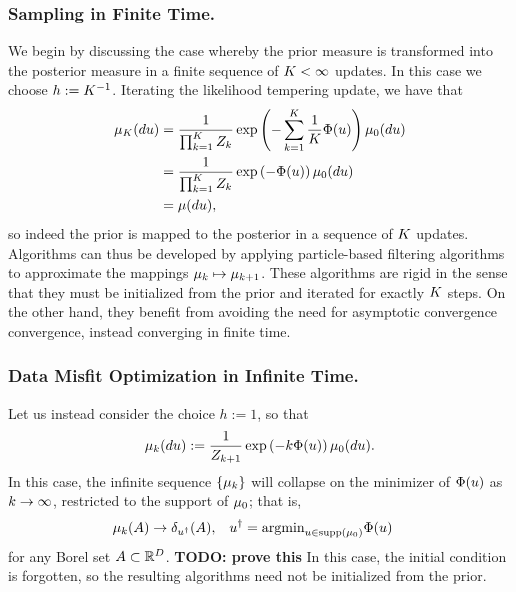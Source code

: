 \documentclass[12pt]{article}
\begin{document}
\subsubsection{Sampling in Finite Time.} 
We begin by discussing the case whereby the prior measure is transformed into the posterior measure 
in a finite sequence of $K < \infty$ updates. In this case we choose $h := K^{-1}$. 
Iterating the likelihood tempering update, we have that 
\begin{align}
\mu_{K}(du) 
&= \frac{1}{\prod_{k=1}^{K} Z_{k}} \exp\left(-\sum_{k=1}^{K} \frac{1}{K} \Phi(u)  \right) \mu_0(du) \nonumber \\
&= \frac{1}{\prod_{k=1}^{K} Z_{k}} \exp\left(-\Phi(u)  \right) \mu_0(du) \nonumber \\
&= \mu(du),
\end{align}
so indeed the prior is mapped to the posterior in a sequence of $K$ updates. 
Algorithms can thus be developed by applying particle-based filtering algorithms to approximate the mappings $\mu_{k} \mapsto \mu_{k+1}$.  
These algorithms are rigid in the sense that they must be initialized from the prior and iterated for exactly $K$ steps. On the other hand, they benefit from 
avoiding the need for asymptotic convergence convergence, instead converging in finite time. 

\subsubsection{Data Misfit Optimization in Infinite Time.} 
Let us instead consider the choice $h := 1$, so that  
\begin{align} 
\mu_{k}(du) := \frac{1}{Z_{k+1}} \exp\left(-k \Phi(u) \right) \mu_0(du).
\end{align}
In this case, the infinite sequence $\{\mu_{k}\}$ will collapse on the minimizer of $\Phi(u)$ as $k \to \infty$, 
restricted to the support of $\mu_0$; that is, 
\begin{align*}
&\mu_{k}(A) \to \delta_{u^\dagger}(A), &&u^{\dagger} = \text{argmin}_{u \in \text{supp}(\mu_0)} \Phi(u)
\end{align*}
for any Borel set $A \subset \mathbb{R}^{D}$. \textbf{TODO: prove this} In this case, the initial condition is forgotten, so the resulting algorithms 
need not be initialized from the prior. 
\end{document}
